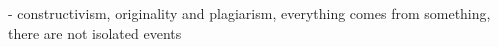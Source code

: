 












- constructivism, originality and plagiarism, everything comes from something, there are not isolated events

